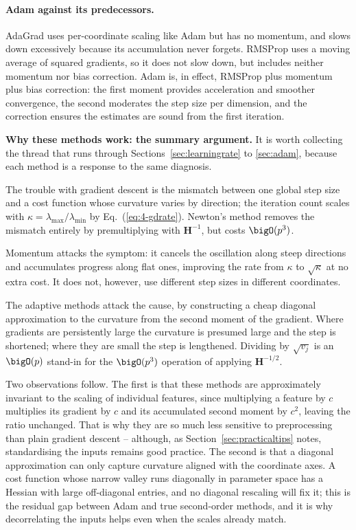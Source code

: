 \paragraph{Adam against its predecessors.}
AdaGrad uses per-coordinate scaling like Adam but has no momentum, and slows
down excessively because its accumulation never forgets.  RMSProp uses a
moving average of squared gradients, so it does not slow down, but includes
neither momentum nor bias correction.  Adam is, in effect, RMSProp plus
momentum plus bias correction: the first moment provides acceleration and
smoother convergence, the second moderates the step size per dimension, and
the correction ensures the estimates are sound from the first iteration.

\begin{notebox}
\textbf{Why these methods work: the summary argument.}  It is worth collecting
the thread that runs through Sections~\ref{sec:learningrate} to
\ref{sec:adam}, because each method is a response to the same diagnosis.

The trouble with gradient descent is the mismatch between one global step size
and a cost function whose curvature varies by direction; the iteration count
scales with $\kappa=\lambda_{\max}/\lambda_{\min}$ by
Eq.~(\ref{eq:4-gdrate}).  Newton's method removes the mismatch entirely by
premultiplying with $\bm{H}^{-1}$, but costs $\bigO(p^{3})$.

Momentum attacks the symptom: it cancels the oscillation along steep
directions and accumulates progress along flat ones, improving the rate from
$\kappa$ to $\sqrt{\kappa}$ at no extra cost.  It does not, however, use
different step sizes in different coordinates.

The adaptive methods attack the cause, by constructing a cheap diagonal
approximation to the curvature from the second moment of the gradient.  Where
gradients are persistently large the curvature is presumed large and the step
is shortened; where they are small the step is lengthened.  Dividing by
$\sqrt{v_j}$ is an $\bigO(p)$ stand-in for the $\bigO(p^{3})$ operation of
applying $\bm{H}^{-1/2}$.

Two observations follow.  The first is that these methods are approximately
invariant to the scaling of individual features, since multiplying a feature
by $c$ multiplies its gradient by $c$ and its accumulated second moment by
$c^{2}$, leaving the ratio unchanged.  That is why they are so much less
sensitive to preprocessing than plain gradient descent -- although, as
Section~\ref{sec:practicaltips} notes, standardising the inputs remains good
practice.  The second is that a diagonal approximation can only capture
curvature aligned with the coordinate axes.  A cost function whose narrow
valley runs diagonally in parameter space has a Hessian with large
off-diagonal entries, and no diagonal rescaling will fix it; this is the
residual gap between Adam and true second-order methods, and it is why
decorrelating the inputs helps even when the scales already match.
\end{notebox}


